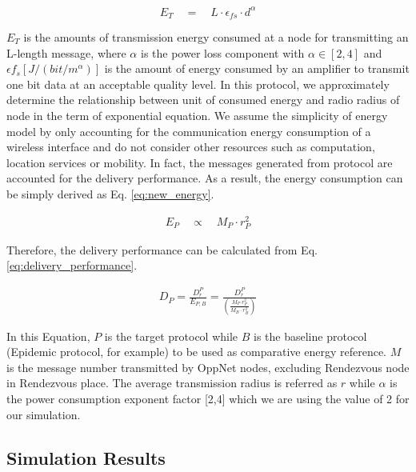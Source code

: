 \begin{equation}
	\label{eq:enegy}
	{ E }_{ T }\quad =\quad L\cdot  { \epsilon  }_{ fs } \cdot  { d }^{ \alpha  }	
\end{equation}

${ E }_{ T }$ is the amounts of transmission energy consumed at a node for transmitting an L-length message, where $\alpha$ is the power loss component with $\alpha \in \left[ 2,4 \right]$ and $\epsilon { f }_{ s }\left[ J/(bit/{ m }^{ \alpha  }) \right]$ is the amount of energy consumed by an amplifier to transmit one bit data at an acceptable quality level.
In this protocol, we approximately determine the relationship between unit of consumed energy and radio radius of node in the term of exponential equation.
We assume the simplicity of energy model by only accounting for the communication energy consumption of a wireless interface and do not consider other resources such as computation, location services or mobility.
In fact, the messages generated from protocol are accounted for the delivery performance.
As a result, the energy consumption can be simply derived as Eq. \ref{eq:new_energy}.

\begin{eqnarray}
	\label{eq:new_energy}
	{ E }_{ P }\quad \propto { \quad M }_{P }\cdot{ r }_{ P }^{ 2 }
\end{eqnarray}

Therefore, the delivery performance can be calculated from  Eq. \ref{eq:delivery_performance}.

\begin{eqnarray}
\label{eq:delivery_performance}
{ D }_{ P }=\frac { { D }_{ r }^{ P } }{ { E }_{ P,B } } =\frac { { D }_{ r }^{ P } }{ \left( \frac { { M }_{ P }{ \cdot r }_{ P }^{ 2 } }{ { M }_{ B }\cdot { r }_{ B }^{ 2 } }  \right)  } 
\end{eqnarray}

In this Equation, $P$ is the target protocol while $B$ is the baseline protocol (Epidemic protocol, for example) to be used as comparative energy reference.
$M$ is the message number transmitted by OppNet nodes, excluding Rendezvous node in Rendezvous place.
The average transmission radius is referred as $r$ while $\alpha$ is the power consumption exponent factor [2,4] which we are using the value of 2 for our simulation.


\subsection{Simulation Results}


